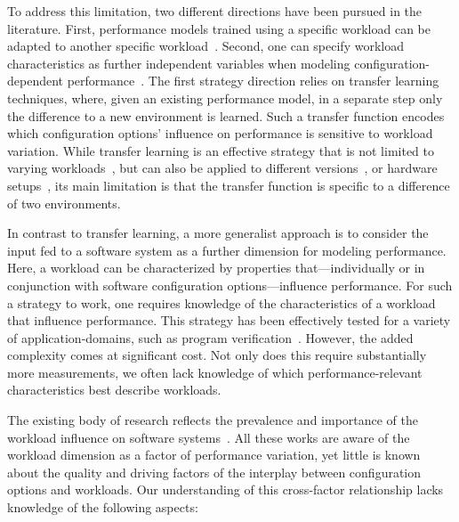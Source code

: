 To address this limitation, two different directions have been pursued in the literature. First, performance models trained using a specific workload can be adapted to another specific workload~\cite{jamishidi_transfer_2017,jamshidi_learning_2018,jamshidi_transfer_gp_2017}. Second,  one can specify workload characteristics as further independent variables when modeling configuration-dependent performance~\cite{koc_satune_2021}.
The first strategy direction relies on transfer learning techniques, where, given an existing performance model, in a separate step only the difference to a new environment is learned. Such a transfer function encodes which configuration options’ influence on performance is sensitive to workload variation. While transfer learning is an effective strategy that is not limited to varying workloads~\cite{jamshidi_learning_2018}, but can also be applied to different versions~\cite{jamishidi_transfer_2017,jamshidi_transfer_gp_2017,martin_transfer_2021}, or hardware setups~\cite{ding_bayesian_2020}, its main limitation is that the transfer function is specific to a difference of two environments.

In contrast to transfer learning, a more generalist approach is to consider the input fed to a software system as a further dimension for modeling performance. Here, a workload can be characterized by properties that---individually or in conjunction with software configuration options---influence performance. For such a strategy to work, one requires knowledge of the characteristics of a workload that influence performance. This strategy has been effectively tested for a  variety of application-domains, such as program verification~\cite{koc_satune_2021}. However, the added complexity comes at significant cost. 
Not only does this require substantially more measurements, we often lack knowledge of which performance-relevant characteristics best describe workloads.
 
The existing body of research reflects the prevalence and importance of the workload influence on software systems~\cite{khavari_compression_2019,maxiaguine_workload_2004,plotnikov_compilation_2013,ding_compilation_2015,falkner_sat_solvers_2015,satzilla_2008,alves_sampling_2020}. All these works are aware of the workload dimension as a factor of performance variation, yet little is known about the quality and driving factors of the interplay between configuration options and workloads. Our understanding of this cross-factor relationship lacks knowledge of the following aspects:

